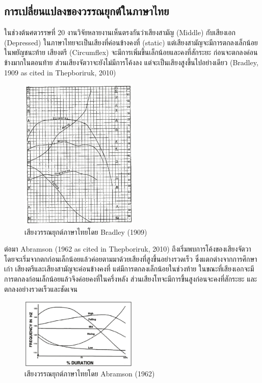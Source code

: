 \documentclass[a4paper]{article}
\begin{document}
\subsection{การเปลี่ยนแปลงของวรรณยุกต์ในภาษาไทย}
    ในช่วงต้นศตวรรษที่ 20 งานวิจัยหลายงานเห็นตรงกันว่าเสียงสามัญ (Middle) กับเสียงเอก (Depressed) ในภาษาไทยจะเป็นเสียงที่ค่อนข้างคงที่ (static) แต่เสียงสามัญจะมีการตกลงเล็กน้อยในพยัญชนะท้าย เสียงตรี (Circumflex) จะมีการเพิ่มขึ้นเล็กน้อยและคงที่สักระยะ ก่อนจะตกลงค่อนข้างมากในตอนท้าย ส่วนเสียงจัตวาจะยังไม่มีการโค้งลง แต่จะเป็นเสียงสูงขึ้นไปอย่างเดียว (Bradley, 1909 as cited in Thepboriruk, 2010)
    \begin{figure}[!ht]
        \begin{center}
        \includegraphics[width=0.5\textwidth]{bradley}
        \end{center}
        \caption{เสียงวรรณยุกต์ภาษาไทยโดย Bradley (1909)}
    \end{figure}

    ต่อมา Abramson (1962 as cited in Thepboriruk, 2010) ถึงเริ่มพบการโค้งของเสียงจัตวา โดยจะเริ่มจากตกก่อนเล็กน้อยแล้วค่อยตามมาด้วยเสียงที่สูงขึ้นอย่างรวดเร็ว ซึ่งแตกต่างจากการศึกษาเก่า เสียงตรีและเสียงสามัญจะค่อนข้างคงที่ แต่มีการตกลงเล็กน้อยในช่วงท้าย ในขณะที่เสียงเอกจะมีการตกลงก่อนเล็กน้อยแล้วจึงค่อยคงที่ในครึ่งหลัง ส่วนเสียงโทจะมีการขึ้นสูงก่อนจะคงที่สักระยะ และตกลงอย่างรวดเร็วและชัดเจน
    \begin{figure}[!ht]
        \begin{center}
        \includegraphics[width=0.5\textwidth]{abramson}
        \end{center}
        \caption{เสียงวรรณยุกต์ภาษาไทยโดย Abramson (1962)}
    \end{figure}
\end{document}
